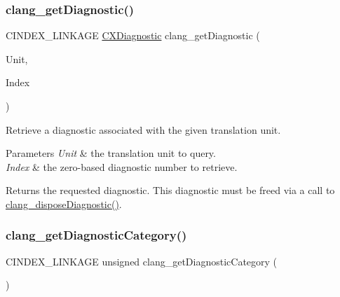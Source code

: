 \subsubsection{\texorpdfstring{clang\+\_\+get\+Diagnostic()}{clang\_getDiagnostic()}}
{\footnotesize\ttfamily C\+I\+N\+D\+E\+X\+\_\+\+L\+I\+N\+K\+A\+GE \hyperlink{group__CINDEX__DIAG_ga44bb8aba7c40590ad25d1763c4fbff7f}{C\+X\+Diagnostic} clang\+\_\+get\+Diagnostic (\begin{DoxyParamCaption}\item[{\hyperlink{group__CINDEX_gacdb7815736ca709ce9a5e1ec2b7e16ac}{C\+X\+Translation\+Unit}}]{Unit,  }\item[{unsigned}]{Index }\end{DoxyParamCaption})}



Retrieve a diagnostic associated with the given translation unit. 


\begin{DoxyParams}{Parameters}
{\em Unit} & the translation unit to query. \\
\hline
{\em Index} & the zero-\/based diagnostic number to retrieve.\\
\hline
\end{DoxyParams}
\begin{DoxyReturn}{Returns}
the requested diagnostic. This diagnostic must be freed via a call to {\ttfamily \hyperlink{group__CINDEX__DIAG_ga07061e0ad7665b7c5ee7253cd1bf4a5c}{clang\+\_\+dispose\+Diagnostic()}}. 
\end{DoxyReturn}
\mbox{\label{group__CINDEX__DIAG_ga0ec085bd59b8b6c935eab0e53a1f348f}} 
\subsubsection{\texorpdfstring{clang\+\_\+get\+Diagnostic\+Category()}{clang\_getDiagnosticCategory()}}
{\footnotesize\ttfamily C\+I\+N\+D\+E\+X\+\_\+\+L\+I\+N\+K\+A\+GE unsigned clang\+\_\+get\+Diagnostic\+Category (\begin{DoxyParamCaption}\item[{\hyperlink{group__CINDEX__DIAG_ga44bb8aba7c40590ad25d1763c4fbff7f}{C\+X\+Diagnostic}}]{ }\end{DoxyParamCaption})}



